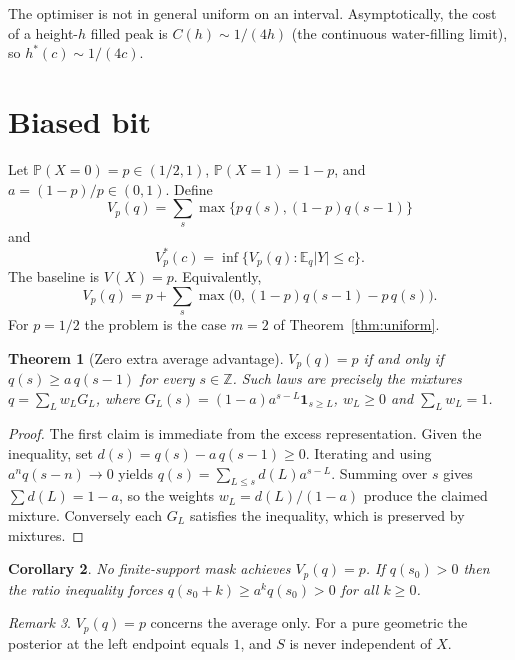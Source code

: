 \documentclass{article}
\newtheorem{theorem}{Theorem}[section]
\newtheorem{corollary}[theorem]{Corollary}
\theoremstyle{definition}
\theoremstyle{remark}
\newtheorem{remark}[theorem]{Remark}
\newcommand{\Z}{\mathbb{Z}}
\newcommand{\E}{\mathbb{E}}
\newcommand{\Prob}{\mathbb{P}}
\begin{document}
The optimiser is not in general uniform on an interval. Asymptotically, the cost of a height-\(h\) filled peak is \(C(h)\sim1/(4h)\) (the continuous water-filling limit), so \(h^*(c)\sim1/(4c)\).

\section{Biased bit}
Let \(\Prob(X=0)=p\in(1/2,1)\), \(\Prob(X=1)=1-p\), and \(a=(1-p)/p\in(0,1)\). Define
\[
V_p(q)=\sum_s\max\bigl\{p\,q(s),(1-p)q(s-1)\bigr\}
\]
and
\[
V_p^*(c)=\inf\{V_p(q):\E_q|Y|\le c\}.
\]
The baseline is \(V(X)=p\). Equivalently,
\[
V_p(q)=p+\sum_s\max\bigl(0,(1-p)q(s-1)-p\,q(s)\bigr).
\]
For \(p=1/2\) the problem is the case \(m=2\) of Theorem~\ref{thm:uniform}.

\begin{theorem}[Zero extra average advantage]\label{thm:zero}
\(V_p(q)=p\) if and only if \(q(s)\ge a\,q(s-1)\) for every \(s\in\Z\). Such laws are precisely the mixtures \(q=\sum_L w_L G_L\), where \(G_L(s)=(1-a)a^{s-L}\mathbf{1}_{s\ge L}\), \(w_L\ge0\) and \(\sum_L w_L=1\).
\end{theorem}
\begin{proof}
The first claim is immediate from the excess representation. Given the inequality, set \(d(s)=q(s)-a\,q(s-1)\ge0\). Iterating and using \(a^n q(s-n)\to0\) yields \(q(s)=\sum_{L\le s}d(L)a^{s-L}\). Summing over \(s\) gives \(\sum d(L)=1-a\), so the weights \(w_L=d(L)/(1-a)\) produce the claimed mixture. Conversely each \(G_L\) satisfies the inequality, which is preserved by mixtures.
\end{proof}

\begin{corollary}
No finite-support mask achieves \(V_p(q)=p\). If \(q(s_0)>0\) then the ratio inequality forces \(q(s_0+k)\ge a^k q(s_0)>0\) for all \(k\ge0\).
\end{corollary}

\begin{remark}
\(V_p(q)=p\) concerns the average only. For a pure geometric the posterior at the left endpoint equals \(1\), and \(S\) is never independent of \(X\).
\end{remark}
\end{document}
